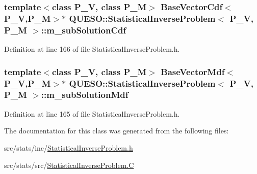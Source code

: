 \hypertarget{class_q_u_e_s_o_1_1_statistical_inverse_problem_a4cb3684669aa87b1d4a6903b55978969}{
\subsubsection[{m\-\_\-sub\-Solution\-Cdf}]{\setlength{\rightskip}{0pt plus 5cm}template$<$class P\-\_\-\-V, class P\-\_\-\-M$>$ {\bf Base\-Vector\-Cdf}$<$P\-\_\-\-V,P\-\_\-\-M$>$$\ast$ {\bf Q\-U\-E\-S\-O\-::\-Statistical\-Inverse\-Problem}$<$ P\-\_\-\-V, P\-\_\-\-M $>$\-::m\-\_\-sub\-Solution\-Cdf\hspace{0.3cm}{\ttfamily [private]}}}\label{class_q_u_e_s_o_1_1_statistical_inverse_problem_a4cb3684669aa87b1d4a6903b55978969}


Definition at line 166 of file Statistical\-Inverse\-Problem.\-h.

\hypertarget{class_q_u_e_s_o_1_1_statistical_inverse_problem_a4e4808280b09aa4ae0584521b78230ef}{
\subsubsection[{m\-\_\-sub\-Solution\-Mdf}]{\setlength{\rightskip}{0pt plus 5cm}template$<$class P\-\_\-\-V, class P\-\_\-\-M$>$ {\bf Base\-Vector\-Mdf}$<$P\-\_\-\-V,P\-\_\-\-M$>$$\ast$ {\bf Q\-U\-E\-S\-O\-::\-Statistical\-Inverse\-Problem}$<$ P\-\_\-\-V, P\-\_\-\-M $>$\-::m\-\_\-sub\-Solution\-Mdf\hspace{0.3cm}{\ttfamily [private]}}}\label{class_q_u_e_s_o_1_1_statistical_inverse_problem_a4e4808280b09aa4ae0584521b78230ef}


Definition at line 165 of file Statistical\-Inverse\-Problem.\-h.



The documentation for this class was generated from the following files\-:\begin{DoxyCompactItemize}
\item 
src/stats/inc/\hyperlink{_statistical_inverse_problem_8h}{Statistical\-Inverse\-Problem.\-h}\item 
src/stats/src/\hyperlink{_statistical_inverse_problem_8_c}{Statistical\-Inverse\-Problem.\-C}\end{DoxyCompactItemize}
